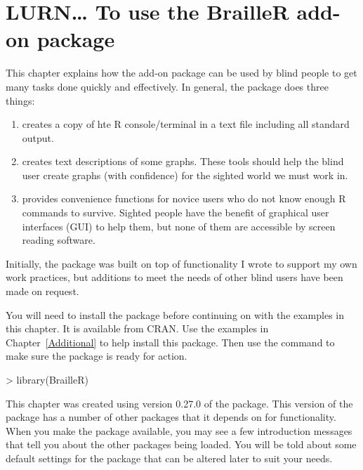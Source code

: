 



\chapter{LURN\ldots{} To use the BrailleR add-on package} 
\label{BrailleR} 
 



 
This chapter explains how the  add-on package can be used by blind people to get many tasks done quickly and effectively. In general, the package does three things:\begin{enumerate} 
\item creates a copy of hte R console/terminal in a text file including all standard output. 
\item creates text descriptions of some graphs. These tools should help the blind user create graphs (with confidence) for the sighted world we must work in. 
\item provides convenience functions for novice users who do not know enough R commands to survive. Sighted people have the benefit of graphical user interfaces (GUI) to help them, but none of them are accessible by screen reading software. 
\end{enumerate} 
Initially, the package was built on top of functionality I wrote to support my own work practices, but additions to meet the needs of other blind \R{} users have been made on request.  
 
 
You will need to install the  package before continuing on with the examples in this chapter. It is available from CRAN. Use the examples in Chapter~\ref{Additional} to help install this package. Then use the  command to make sure the package is ready for action. 

\begin{Schunk}
\begin{Sinput}
> library(BrailleR) 
\end{Sinput}
\end{Schunk}

This chapter was created using version 0.27.0 of the  package. This version of the package has a number of other packages that it depends on for functionality. When you make the  package available, you may see a few introduction messages that tell you about the other packages being loaded. You will be told about some default settings for the package that can be altered later to suit your needs. 
 
